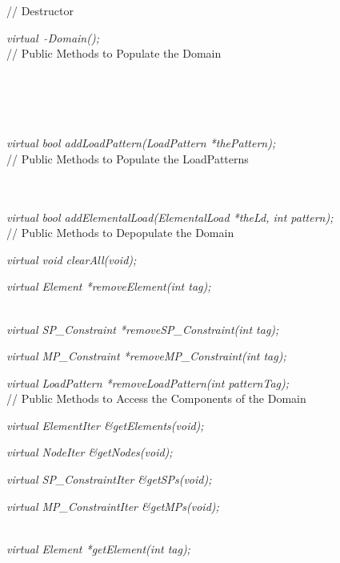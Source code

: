 // Destructor  

{\em virtual~ $\tilde{}$Domain();}  \\ 

// Public Methods to Populate the Domain  

  \\ 
 \\  
 \\
  \\  
{\em virtual bool addLoadPattern(LoadPattern *thePattern);}\\ 

// Public Methods to Populate the LoadPatterns  

  \\   
  \\   
{\em virtual bool addElementalLoad(ElementalLoad *theLd, int pattern);}\\

// Public Methods to Depopulate the Domain  

{\em virtual void clearAll(void);}

{\em virtual Element *removeElement(int tag);}

\\    
{\em virtual SP\_Constraint *removeSP\_Constraint(int tag);}

{\em virtual MP\_Constraint *removeMP\_Constraint(int tag);} 

{\em virtual LoadPattern *removeLoadPattern(int patternTag);}\\ 

// Public Methods to Access the Components of the Domain  

{\em virtual ElementIter \&getElements(void);} 

{\em virtual NodeIter \&getNodes(void);} 

{\em virtual SP\_ConstraintIter \&getSPs(void);} 

{\em virtual MP\_ConstraintIter \&getMPs(void);} 

 \\ 
{\em virtual  Element *getElement(int tag);}

